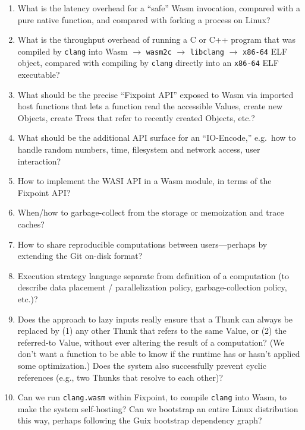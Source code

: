 \documentclass{article}
\newcommand{\valuex}{\textrm{Value}\xspace}
\newcommand{\valuexs}{\textrm{Value}s\xspace}
\newcommand{\objects}{\textrm{Object}s\xspace}
\newcommand{\thunk}{\textrm{Thunk}\xspace}
\newcommand{\thunks}{\textrm{Thunk}s\xspace}
\newcommand{\trees}{\textrm{Tree}s\xspace}
\begin{document}
\begin{enumerate}[itemsep=0pt]
\item What is the latency overhead for a ``safe'' Wasm invocation, compared with a pure native function,
  and compared with forking a process on Linux?

\item What is the throughput overhead of running a C or C++ program
  that was compiled by \texttt{clang} into Wasm $\rightarrow$
  \texttt{wasm2c} $\rightarrow$ \texttt{libclang} $\rightarrow$
  \texttt{x86-64} ELF object, compared with compiling by \texttt{clang}
  directly into an \texttt{x86-64} ELF executable?

\item What should be the precise ``Fixpoint API'' exposed to Wasm via imported host functions that lets a function read the accessible \valuexs, create new \objects,
  create \trees that refer to recently created \objects, etc.?
  
\item What should be the additional API surface for an ``IO-Encode,'' e.g.~how to handle random numbers, time, filesystem and network access, user interaction?

\item How to implement the WASI API in a Wasm module, in terms of the Fixpoint API?
  
\item When/how to garbage-collect from the storage or memoization and trace caches?

\item How to share reproducible computations between users---perhaps by extending the Git on-disk format?
  
\item Execution strategy language separate from definition of a
  computation (to describe data placement / parallelization policy,
  garbage-collection policy, etc.)?
  
\item Does the approach to lazy inputs really ensure that a \thunk can
  always be replaced by (1) any other \thunk that refers to the same
  \valuex, or (2) the referred-to \valuex, without ever altering the
  result of a computation? (We don't want a function to be able to
  know if the runtime has or hasn't applied some optimization.) Does
  the system also successfully prevent cyclic references (e.g., two \thunks that resolve to
  each other)?

\item Can we run \texttt{clang.wasm} within Fixpoint, to compile
  \texttt{clang} into Wasm, to make the system self-hosting? Can we bootstrap an entire Linux distribution
  this way, perhaps following the Guix bootstrap dependency graph?


\end{enumerate}
\end{document}
